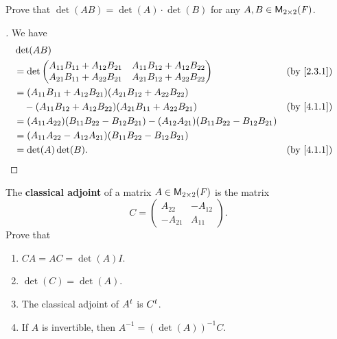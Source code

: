 \begin{ex}\label{ex:4.1.9}
	Prove that \(\det(AB) = \det(A) \cdot \det(B)\) for any \(A, B \in \ms[2][2][\F]\).
\end{ex}

\begin{proof}[]
	We have
	\begin{align*}
		 & \det(AB)                                                                                                                        \\
		 & = \det\begin{pmatrix}
			         A_{1 1} B_{1 1} + A_{1 2} B_{2 1} & A_{1 1} B_{1 2} + A_{1 2} B_{2 2} \\
			         A_{2 1} B_{1 1} + A_{2 2} B_{2 1} & A_{2 1} B_{1 2} + A_{2 2} B_{2 2}
		         \end{pmatrix}                                        &  & \by{2.3.1}                                                     \\
		 & = (A_{1 1} B_{1 1} + A_{1 2} B_{2 1}) (A_{2 1} B_{1 2} + A_{2 2} B_{2 2})                                                       \\
		 & \quad - (A_{1 1} B_{1 2} + A_{1 2} B_{2 2}) (A_{2 1} B_{1 1} + A_{2 2} B_{2 1})                                 &  & \by{4.1.1} \\
		 & = (A_{1 1} A_{2 2}) (B_{1 1} B_{2 2} - B_{1 2} B_{2 1}) - (A_{1 2} A_{2 1}) (B_{1 1} B_{2 2} - B_{1 2} B_{2 1})                 \\
		 & = (A_{1 1} A_{2 2} - A_{1 2} A_{2 1}) (B_{1 1} B_{2 2} - B_{1 2} B_{2 1})                                                       \\
		 & = \det(A) \det(B).                                                                                              &  & \by{4.1.1}
	\end{align*}
\end{proof}

\begin{ex}\label{ex:4.1.10}
	The \textbf{classical adjoint} of a matrix \(A \in \ms[2][2][\F]\) is the matrix
	\[
		C = \begin{pmatrix}
			A_{2 2}  & -A_{1 2} \\
			-A_{2 1} & A_{1 1}
		\end{pmatrix}.
	\]
	Prove that
	\begin{enumerate}
		\item \(CA = AC = \det(A) I\).
		\item \(\det(C) = \det(A)\).
		\item The classical adjoint of \({A}^{t}\) is \({C}^{t}\).
		\item If \(A\) is invertible, then \(A^{-1} = (\det(A))^{-1} C\).
	\end{enumerate}
\end{ex}

